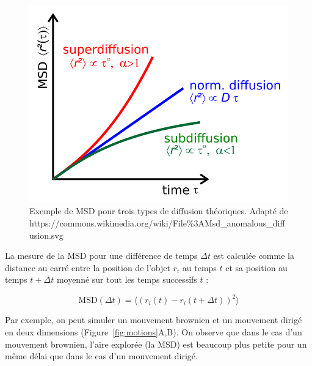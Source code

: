 \documentclass[12pt,a4paper,twoside,openright]{book}
\begin{document}
\begin{figure}[htbp]
\centering
\includegraphics{figures/results/imaging/wiki_diffuse.png}
\caption[Exemple de MSD pour trois types de diffusion théoriques]{\label{fig:wiki_diffuse}Exemple
de MSD pour trois types de diffusion théoriques. Adapté de
https://commons.wikimedia.org/wiki/File\%3AMsd\_anomalous\_diffusion.svg}
\end{figure}

La mesure de la MSD pour une différence de temps \(\Delta t\) est
calculée comme la distance au carré entre la position de l'objet \(r_i\)
au temps \(t\) et sa position au temps \(t+\Delta t\) moyenné sur tout
les temps successifs \(t\) :

\[
\mbox{MSD}(\Delta t) = \langle (r_i(t) - r_i(t + \Delta t)) ^ 2 \rangle
\]

Par exemple, on peut simuler un mouvement brownien et un mouvement
dirigé en deux dimensions (Figure~\ref{fig:motions}A,B). On observe que
dans le cas d'un mouvement brownien, l'aire explorée (la MSD) est
beaucoup plus petite pour un même délai que dans le cas d'un mouvement
dirigé.
\end{document}
